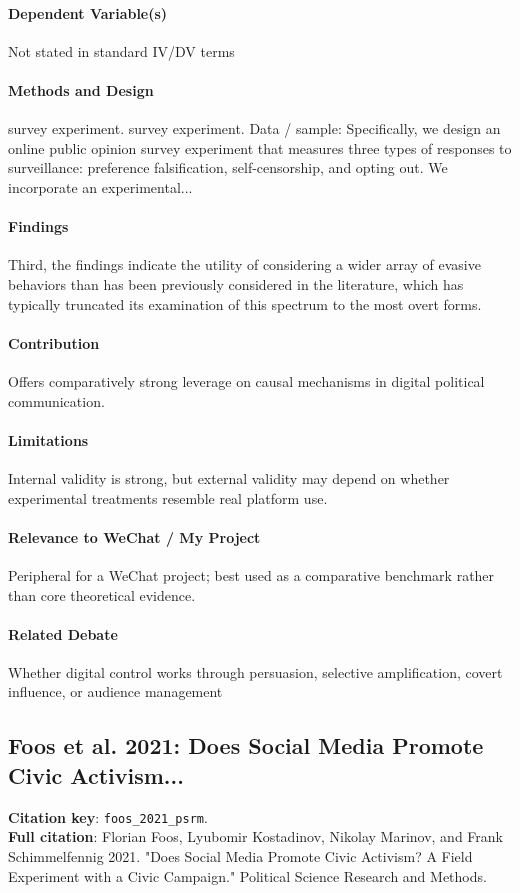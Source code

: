\documentclass[12pt]{article}
\begin{document}
\paragraph{Dependent Variable(s)} Not stated in standard IV/DV terms

\paragraph{Methods and Design} survey experiment. survey experiment. Data / sample: Specifically, we design an online public opinion survey experiment that measures three types of responses to surveillance: preference falsification, self-censorship, and opting out. We incorporate an experimental...

\paragraph{Findings} Third, the findings indicate the utility of considering a wider array of evasive behaviors than has been previously considered in the literature, which has typically truncated its examination of this spectrum to the most overt forms.

\paragraph{Contribution} Offers comparatively strong leverage on causal mechanisms in digital political communication.

\paragraph{Limitations} Internal validity is strong, but external validity may depend on whether experimental treatments resemble real platform use.

\paragraph{Relevance to WeChat / My Project} Peripheral for a WeChat project; best used as a comparative benchmark rather than core theoretical evidence.

\paragraph{Related Debate} Whether digital control works through persuasion, selective amplification, covert influence, or audience management


\subsection{Foos et al. 2021: Does Social Media Promote Civic Activism...}
\textbf{Citation key}: \texttt{foos\_2021\_psrm}.\\
\textbf{Full citation}: Florian Foos, Lyubomir Kostadinov, Nikolay Marinov, and Frank Schimmelfennig 2021. "Does Social Media Promote Civic Activism? A Field Experiment with a Civic Campaign." Political Science Research and Methods.
\end{document}
